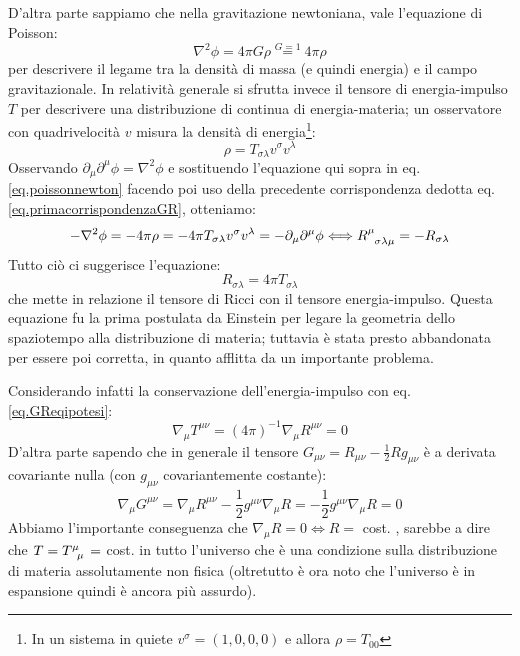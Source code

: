 D'altra parte sappiamo che nella gravitazione newtoniana, vale l'equazione di Poisson:
\begin{equation}
    \nabla^2 \phi = 4\pi G \rho \overset{G=1}{=} 4 \pi \rho
    \label{eq.poissonnewton}
\end{equation}
per descrivere il legame tra la densità di massa (e quindi energia) e il campo gravitazionale. In relatività generale si sfrutta invece il tensore di energia-impulso $T$ per descrivere una distribuzione di continua di energia-materia; un osservatore con quadrivelocità $v$ misura la densità di energia\footnote{In un sistema in quiete $v^\sigma = (1,0,0,0)$ e allora $\rho = T_{00}$}:
\begin{equation}
    \rho = T_{\sigma\lambda}v^\sigma v^\lambda
    \label{eq.rhomisurata}
\end{equation}
Osservando $\partial_\mu \partial^\mu \phi =  \nabla^2 \phi$ e sostituendo l'equazione qui sopra in eq. \ref{eq.poissonnewton} facendo poi uso della precedente corrispondenza dedotta eq. \ref{eq.primacorrispondenzaGR}, otteniamo:
\begin{equation*}
    - \nabla^2 \phi = - 4\pi \rho = - 4 \pi T_{\sigma\lambda}v^\sigma v^\lambda = - \partial_\mu \partial^\mu \phi \Longleftrightarrow \tensor{R}{^\mu_{\sigma\lambda\mu}} = - R_{\sigma\lambda}
\end{equation*}
Tutto ciò ci suggerisce l'equazione:
\begin{equation}
    R_{\sigma\lambda} = 4 \pi T_{\sigma\lambda}
    \label{eq.GReqipotesi}
\end{equation}
che mette in relazione il tensore di Ricci con il tensore energia-impulso. Questa equazione fu la prima postulata da Einstein per legare la geometria dello spaziotempo alla distribuzione di materia; tuttavia è stata presto abbandonata per essere poi corretta, in quanto afflitta da un importante problema.

Considerando infatti la conservazione dell'energia-impulso con eq. \ref{eq.GReqipotesi}:
\begin{equation*}
    \nabla_\mu T^{\mu\nu} = (4\pi)^{-1}\nabla_\mu R^{\mu\nu} = 0
\end{equation*}
D'altra parte sapendo che in generale il tensore $G_{\mu\nu}= R_{\mu\nu} -\frac{1}{2}Rg_{\mu\nu}$ è a derivata covariante nulla (con $g_{\mu\nu}$ covariantemente costante):
\begin{equation*}
    \nabla_\mu G^{\mu\nu} = \nabla_\mu R^{\mu\nu} - \frac{1}{2}g^{\mu\nu} \nabla_\mu R = - \frac{1}{2}g^{\mu\nu} \nabla_\mu R = 0
\end{equation*}
Abbiamo l'importante conseguenza che $\nabla_\mu R = 0 \iff R=$ cost. , sarebbe a dire che $T=\tensor{T}{^\mu_\mu}=$ cost. in tutto l'universo che è una condizione sulla distribuzione di materia assolutamente non fisica (oltretutto è ora noto che l'universo è in espansione quindi è ancora più assurdo).

